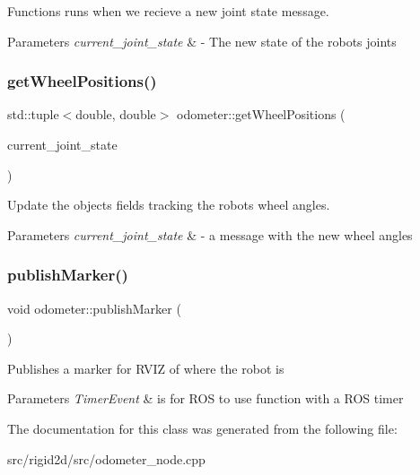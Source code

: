 Functions runs when we recieve a new joint state message. 


\begin{DoxyParams}{Parameters}
{\em current\+\_\+joint\+\_\+state} & -\/ The new state of the robot\textquotesingle{}s joints \\
\hline
\end{DoxyParams}
\mbox{\label{classodometer_a246018786026cc9d61b97c80f340e771}} 
\subsubsection{\texorpdfstring{get\+Wheel\+Positions()}{getWheelPositions()}}
{\footnotesize\ttfamily std\+::tuple$<$double, double$>$ odometer\+::get\+Wheel\+Positions (\begin{DoxyParamCaption}\item[{sensor\+\_\+msgs\+::\+Joint\+State \&}]{current\+\_\+joint\+\_\+state }\end{DoxyParamCaption})\hspace{0.3cm}{\ttfamily [inline]}}



Update the object\textquotesingle{}s fields tracking the robot\textquotesingle{}s wheel angles. 


\begin{DoxyParams}{Parameters}
{\em current\+\_\+joint\+\_\+state} & -\/ a message with the new wheel angles \\
\hline
\end{DoxyParams}
\mbox{\label{classodometer_a70ae27127c495fde6b970b4ef432b326}} 
\subsubsection{\texorpdfstring{publish\+Marker()}{publishMarker()}}
{\footnotesize\ttfamily void odometer\+::publish\+Marker (\begin{DoxyParamCaption}\item[{const ros\+::\+Timer\+Event \&}]{ }\end{DoxyParamCaption})\hspace{0.3cm}{\ttfamily [inline]}}

Publishes a marker for R\+V\+IZ of where the robot is 
\begin{DoxyParams}{Parameters}
{\em Timer\+Event} & is for R\+OS to use function with a R\+OS timer \\
\hline
\end{DoxyParams}


The documentation for this class was generated from the following file\+:\begin{DoxyCompactItemize}
\item 
src/rigid2d/src/odometer\+\_\+node.\+cpp\end{DoxyCompactItemize}
